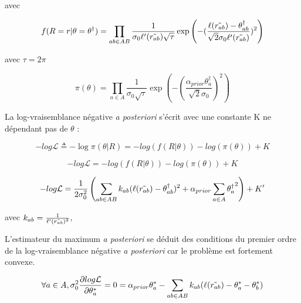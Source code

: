 avec

\begin{equation}
 f(R=r|\theta=\theta^\dagger)= \prod_{ab \in AB} \frac{1}{\sigma_0\ell'(\Tilde{r_{ab}})\sqrt{\tau}}\exp \left( -(\frac{\ell(\Tilde{r_{ab}})-\theta_{ab}^\dagger}{\sqrt{2}\sigma_0\ell'(\Tilde{r_{ab}})})^2 \right)    
\end{equation}

avec  $\tau=2\pi$

\begin{equation}
 \pi(\theta)= \prod_{a \in A} \frac{1}{\sigma_0\sqrt{\tau}}\exp \left( -(\frac{\alpha_{prior}\theta^\dagger_a}{\sqrt{2}\sigma_0})^2 \right)    
\end{equation}


La log-vraisemblance négative \textit{a posteriori} s'écrit avec une constante K ne dépendant pas de $\theta$ :

\begin{equation}
 -log \mathcal{L} \triangleq -\log{\pi(\theta|R)} = -log(f(R|\theta))  -log(\pi(\theta))+ K     
\end{equation}


\begin{equation}
 -log \mathcal{L} = - log(f(R|\theta)) - log(\pi(\theta))+ K     
\end{equation}

\begin{equation}
 -log \mathcal{L} = \frac{1}{2\sigma_0^2} \left( \sum_{ab \in AB} k_{ab}(\ell(\Tilde{r_{ab}})-\theta_{ab}^\dagger)^2 + \alpha_{prior}\sum_{a \in A}{\theta^\dagger_a}^2 \right) + K'     
\end{equation}

avec $k_{ab} = \frac{1}{\ell'(\Tilde{r_{ab}})^2}$,

L'estimateur du maximum \textit{a posteriori} se déduit des conditions du premier ordre de la log-vraisemblance négative \textit{a posteriori} car le problème est fortement convexe.

\begin{equation}\label{equation:cpo}
\forall a \in A, \sigma_0^2\frac{\partial{log\mathcal{L}}}{\partial{\theta^*_a}} = 0 = \alpha_{prior}\theta^*_a - \sum_{ab \in AB}k_{ab}(\ell(\Tilde{r_{ab}})-\theta^*_a-\theta^*_b)
\end{equation}

